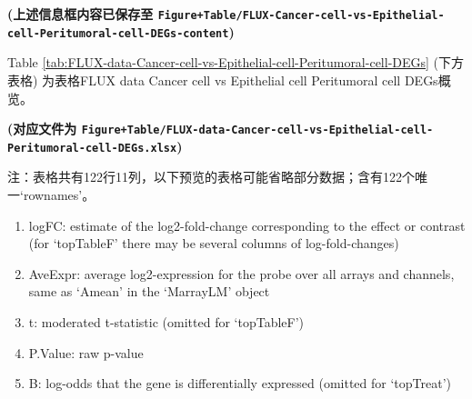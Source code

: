 \documentclass[
]{article}
\providecommand{\tightlist}{%
  \setlength{\itemsep}{0pt}\setlength{\parskip}{0pt}}
\begin{document}
\textbf{(上述信息框内容已保存至 \texttt{Figure+Table/FLUX-Cancer-cell-vs-Epithelial-cell-Peritumoral-cell-DEGs-content})}

\begin{center}\vspace{1.5cm}\end{center}

Table \ref{tab:FLUX-data-Cancer-cell-vs-Epithelial-cell-Peritumoral-cell-DEGs} (下方表格) 为表格FLUX data Cancer cell vs Epithelial cell Peritumoral cell DEGs概览。

\textbf{(对应文件为 \texttt{Figure+Table/FLUX-data-Cancer-cell-vs-Epithelial-cell-Peritumoral-cell-DEGs.xlsx})}

\begin{center}\begin{tcolorbox}[colback=gray!10, colframe=gray!50, width=0.9\linewidth, arc=1mm, boxrule=0.5pt]注：表格共有122行11列，以下预览的表格可能省略部分数据；含有122个唯一`rownames'。
\end{tcolorbox}
\end{center}
\begin{center}\begin{tcolorbox}[colback=gray!10, colframe=gray!50, width=0.9\linewidth, arc=1mm, boxrule=0.5pt]\begin{enumerate}\tightlist
\item logFC:  estimate of the log2-fold-change corresponding to the effect or contrast (for ‘topTableF’ there may be several columns of log-fold-changes)
\item AveExpr:  average log2-expression for the probe over all arrays and channels, same as ‘Amean’ in the ‘MarrayLM’ object
\item t:  moderated t-statistic (omitted for ‘topTableF’)
\item P.Value:  raw p-value
\item B:  log-odds that the gene is differentially expressed (omitted for ‘topTreat’)
\end{enumerate}\end{tcolorbox}
\end{center}
\end{document}
